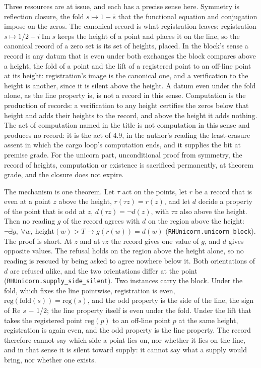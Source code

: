 \documentclass[10pt]{article}
\begin{document}
Three resources are at issue, and each has a precise sense here.
Symmetry is reflection closure, the fold \(s \mapsto 1 - \bar{s}\) that
the functional equation and conjugation impose on the zeros. The
canonical record is what registration leaves: registration
\(s \mapsto 1/2 + i\operatorname{Im} s\) keeps the height of a point and
places it on the line, so the canonical record of a zero set is its set
of heights, placed. In the block's sense a record is any datum that is
even under both exchanges the block compares above a height, the fold of
a point and the lift of a registered point to an off-line point at its
height: registration's image is the canonical one, and a verification to
the height is another, since it is silent above the height. A datum even
under the fold alone, as the line property is, is not a record in this
sense. Computation is the production of records: a verification to any
height certifies the zeros below that height and adds their heights to
the record, and above the height it adds nothing. The act of computation
named in the title is not computation in this sense and produces no
record: it is the act of 4.9, in the author's reading the least-erasure
assent in which the cargo loop's computation ends, and it supplies the
bit at premise grade. For the unicorn part, unconditional proof from
symmetry, the record of heights, computation or existence is sacrificed
permanently, at theorem grade, and the closure does not expire.

The mechanism is one theorem. Let \(\tau\) act on the points, let \(r\)
be a record that is even at a point \(z\) above the height,
\(r(\tau z) = r(z)\), and let \(d\) decide a property of the point that
is odd at \(z\), \(d(\tau z) = \neg d(z)\), with \(\tau z\) also above
the height. Then no reading \(g\) of the record agrees with \(d\) on the
region above the height:
\(\neg\exists g,\ \forall w,\ \mathrm{height}(w) > T \to g(r(w)) = d(w)\)
(\texttt{RHUnicorn.\allowbreak{}unicorn\_\allowbreak{}block}). The proof
is short. At \(z\) and at \(\tau z\) the record gives one value of
\(g\), and \(d\) gives opposite values. The refusal holds on the region
above the height alone, so no reading is rescued by being asked to agree
nowhere below it. Both orientations of \(d\) are refused alike, and the
two orientations differ at the point
(\texttt{RHUnicorn.\allowbreak{}supply\_\allowbreak{}side\_\allowbreak{}silent}).
Two instances carry the block. Under the fold, which fixes the line
pointwise, registration is even,
\(\mathrm{reg}(\mathrm{fold}(s)) = \mathrm{reg}(s)\), and the odd
property is the side of the line, the sign of Re \(s\) − 1/2; the line
property itself is even under the fold. Under the lift that takes the
registered point \(\mathrm{reg}(p)\) to an off-line point \(p\) at the
same height, registration is again even, and the odd property is the
line property. The record therefore cannot say which side a point lies
on, nor whether it lies on the line, and in that sense it is silent
toward supply: it cannot say what a supply would bring, nor whether one
exists.
\end{document}
